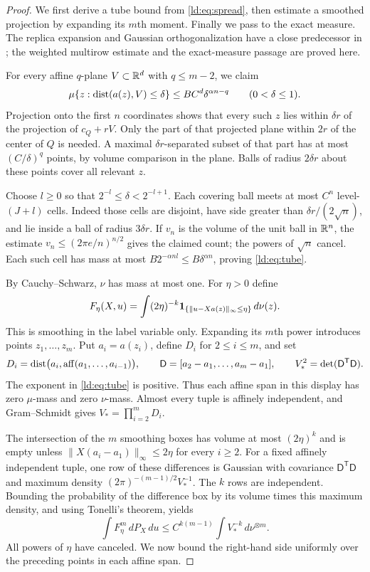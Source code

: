 \begin{proof}
We first derive a tube bound from \eqref{ld:eq:spread}, then estimate a
smoothed projection by expanding its $m$th moment. Finally we pass to
the exact measure. The replica expansion and Gaussian orthogonalization
have a close predecessor in \cite[Section~7, Lemma~12]{SSV2019}; the
weighted multirow estimate and the exact-measure passage are proved here.

For every affine $q$-plane $V\subset\mathbb R^d$ with $q\le m-2$, we claim
\begin{equation}\label{ld:eq:tube}
 \mu\{z:\operatorname{dist}(a(z),V)\le\delta\}
 \le BC^d\delta^{\alpha n-q}\qquad(0<\delta\le1).
\end{equation}
Projection onto the first $n$ coordinates shows that every such $z$
lies within $\delta r$ of the projection of $c_Q+rV$. Only the part of
that projected plane within $2r$ of the center of $Q$ is needed. A
maximal $\delta r$-separated subset of that part has at most
$(C/\delta)^q$ points, by volume comparison in the plane. Balls of
radius $2\delta r$ about these points cover all relevant $z$.

Choose $l\ge0$ so that $2^{-l}\le\delta<2^{-l+1}$. Each covering
ball meets at most $C^n$ level-$(J+l)$ cells. Indeed those cells are
disjoint, have side greater than $\delta r/(2\sqrt n)$, and lie
inside a ball of radius $3\delta r$. If $v_n$ is the volume of the
unit ball in $\mathbb R^n$, the estimate
$v_n\le(2\pi e/n)^{n/2}$ gives the claimed count; the powers of
$\sqrt n$ cancel. Each such cell has mass at most
$B2^{-\alpha nl}\le B\delta^{\alpha n}$, proving \eqref{ld:eq:tube}.

By Cauchy--Schwarz, $\nu$ has mass at most one. For $\eta>0$ define
\[
 F_\eta(X,u)=\int (2\eta)^{-k}
 \mathbf 1_{\{\|u-Xa(z)\|_\infty\le\eta\}}\,d\nu(z).
\]
This is smoothing in the label variable only. Expanding its $m$th
power introduces points $z_1,\ldots,z_m$. Put $a_i=a(z_i)$, define
$D_i$ for $2\le i\le m$, and set
\[
 D_i=\operatorname{dist}\bigl(a_i,\operatorname{aff}(a_1,\ldots,a_{i-1})\bigr),\qquad
 \mathsf D=[a_2-a_1,\ldots,a_m-a_1],\qquad
 V_*^2=\det(\mathsf D^{\mathsf T}\mathsf D).
\]
The exponent in \eqref{ld:eq:tube} is positive. Thus each affine span in
this display has zero $\mu$-mass and zero $\nu$-mass. Almost every
tuple is affinely independent, and Gram--Schmidt gives
$V_*=\prod_{i=2}^mD_i$.

The intersection of the $m$ smoothing boxes has volume at most
$(2\eta)^k$ and is empty unless
$\|X(a_i-a_1)\|_\infty\le2\eta$ for every $i\ge2$.
For a fixed affinely independent tuple, one row of these differences
is Gaussian with covariance $\mathsf D^{\mathsf T}\mathsf D$ and maximum density
$(2\pi)^{-(m-1)/2}V_*^{-1}$. The $k$ rows are independent.
Bounding the probability of the difference box by its volume times
this maximum density, and using Tonelli's theorem, yields
\begin{equation}\label{ld:eq:moment}
 \int F_\eta^m\,dP_X\,du
 \le C^{k(m-1)}\int V_*^{-k}\,d\nu^{\otimes m}.
\end{equation}
All powers of $\eta$ have canceled. We now bound the right-hand side
uniformly over the preceding points in each affine span.


\end{proof}
